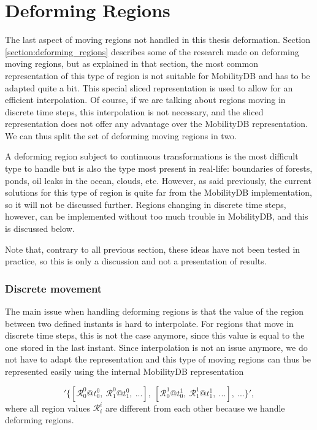 
\section{Deforming Regions}
\label{section:deforming}

The last aspect of moving regions not handled in this thesis deformation. Section \ref{section:deforming_regions} describes some of the research made on deforming moving regions, but as explained in that section, the most common representation of this type of region is not suitable for MobilityDB and has to be adapted quite a bit. This special sliced representation is used to allow for an efficient interpolation. Of course, if we are talking about regions moving in discrete time steps, this interpolation is not necessary, and the sliced representation does not offer any advantage over the MobilityDB representation. We can thus split the set of deforming moving regions in two.

A deforming region subject to continuous transformations is the most difficult type to handle but is also the type most present in real-life: boundaries of forests, ponds, oil leaks in the ocean, clouds, etc. However, as said previously, the current solutions for this type of region is quite far from the MobilityDB implementation, so it will not be discussed further. Regions changing in discrete time steps, however, can be implemented without too much trouble in MobilityDB, and this is discussed below.

Note that, contrary to all previous section, these ideas have not been tested in practice, so this is only a discussion and not a presentation of results.

\subsubsection{Discrete movement}

The main issue when handling deforming regions is that the value of the region between two defined instants is hard to interpolate. For regions that move in discrete time steps, this is not the case anymore, since this value is equal to the one stored in the last instant. Since interpolation is not an issue anymore, we do not have to adapt the representation and this type of moving regions can thus be represented easily using the internal MobilityDB representation

\[
    '\{[\mathcal{R}_0^0@t_0^0,\ \mathcal{R}_1^0@t_1^0,\ ...],\ [\mathcal{R}_0^1@t_0^1,\ \mathcal{R}_1^1@t_1^1,\ ...],\ ...\}', 
\]
where all region values $\mathcal{R}_i^i$ are different from each other because we handle deforming regions.

